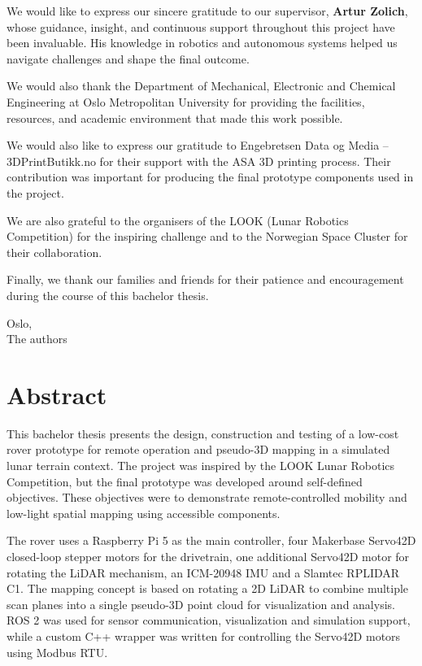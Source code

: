 We would like to express our sincere gratitude to our supervisor, \textbf{Artur Zolich}, whose guidance, insight, and continuous support throughout this project have been invaluable. His knowledge in robotics and autonomous systems helped us navigate challenges and shape the final outcome.

We would also thank the Department of Mechanical, Electronic and Chemical Engineering at Oslo Metropolitan University for providing the facilities, resources, and academic environment that made this work possible.

We would also like to express our gratitude to Engebretsen Data og Media – 3DPrintButikk.no for their support with the ASA 3D printing process. Their contribution was important for producing the final prototype components used in the project.

We are also grateful to the organisers of the LOOK (Lunar Robotics Competition) for the inspiring challenge and to the Norwegian Space Cluster for their collaboration.

Finally, we thank our families and friends for their patience and encouragement during the course of this bachelor thesis.



\vspace{1cm}
\begin{flushright}
Oslo, \the\year \\
The authors
\end{flushright}


\section*{Abstract}
This bachelor thesis presents the design, construction and testing of a low-cost rover prototype for remote operation and pseudo-3D mapping in a simulated lunar terrain context. The project was inspired by the LOOK Lunar Robotics Competition, but the final prototype was developed around self-defined objectives. These objectives were to demonstrate remote-controlled mobility and low-light spatial mapping using accessible components.

The rover uses a Raspberry Pi 5 as the main controller, four Makerbase Servo42D closed-loop stepper motors for the drivetrain, one additional Servo42D motor for rotating the LiDAR mechanism, an ICM-20948 IMU and a Slamtec RPLIDAR C1. The mapping concept is based on rotating a 2D LiDAR to combine multiple scan planes into a single pseudo-3D point cloud for visualization and analysis. ROS 2 was used for sensor communication, visualization and simulation support, while a custom C++ wrapper was written for controlling the Servo42D motors using Modbus RTU.

